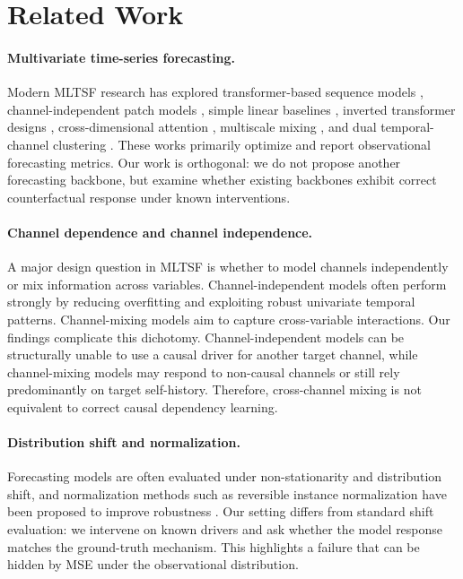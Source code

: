 \documentclass{article}
\begin{document}
\iffalse

\section{Related Work}

\paragraph{Multivariate time-series forecasting.}
Modern MLTSF research has explored transformer-based sequence models
\citep{zhou2021informer,wu2021autoformer,zhou2022fedformer}, channel-independent
patch models \citep{nie2023patchtst}, simple linear baselines
\citep{zeng2023transformers}, inverted transformer designs \citep{liu2024itransformer},
cross-dimensional attention \citep{zhang2023crossformer}, multiscale mixing
\citep{wang2024timemixer}, and dual temporal-channel clustering \citep{qiu2025duet}.
These works primarily optimize and report observational
forecasting metrics. Our work is orthogonal: we do not propose another forecasting
backbone, but examine whether existing backbones exhibit correct counterfactual
response under known interventions.

\paragraph{Channel dependence and channel independence.}
A major design question in MLTSF is whether to model channels independently or mix
information across variables. Channel-independent models often perform strongly by
reducing overfitting and exploiting robust univariate temporal patterns. Channel-mixing
models aim to capture cross-variable interactions. Our findings complicate this
dichotomy. Channel-independent models can be structurally unable to use a causal
driver for another target channel, while channel-mixing models may respond to
non-causal channels or still rely predominantly on target self-history. Therefore,
cross-channel mixing is not equivalent to correct causal dependency learning.

\paragraph{Distribution shift and normalization.}
Forecasting models are often evaluated under non-stationarity and distribution shift,
and normalization methods such as reversible instance normalization have been proposed
to improve robustness \citep{kim2022revin}. Our setting differs from standard shift
evaluation: we intervene on known drivers and ask whether the model response matches
the ground-truth mechanism. This highlights a failure that can be hidden by MSE under
the observational distribution.
\end{document}
